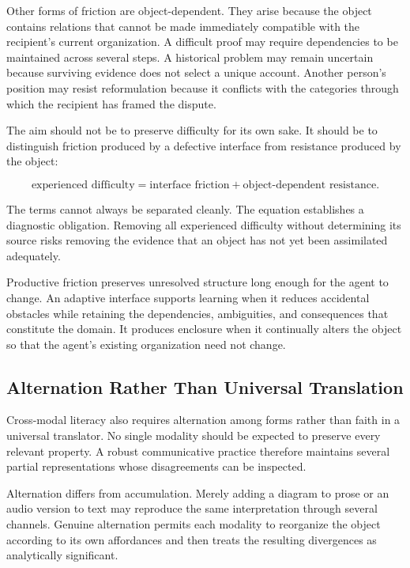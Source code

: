 \documentclass[11pt]{article}
\begin{document}
Other forms of friction are object-dependent. They arise because the object
contains relations that cannot be made immediately compatible with the
recipient's current organization. A difficult proof may require dependencies
to be maintained across several steps. A historical problem may remain
uncertain because surviving evidence does not select a unique account.
Another person's position may resist reformulation because it conflicts with
the categories through which the recipient has framed the dispute.

The aim should not be to preserve difficulty for its own sake. It should be to
distinguish friction produced by a defective interface from resistance
produced by the object:

\begin{equation}
  \text{experienced difficulty}
  =
  \text{interface friction}
  +
  \text{object-dependent resistance}.
  \label{eq:difficulty-decomposition}
\end{equation}

The terms cannot always be separated cleanly. The equation establishes a
diagnostic obligation. Removing all experienced difficulty without
determining its source risks removing the evidence that an object has not yet
been assimilated adequately.

Productive friction preserves unresolved structure long enough for the agent
to change. An adaptive interface supports learning when it reduces accidental
obstacles while retaining the dependencies, ambiguities, and consequences
that constitute the domain. It produces enclosure when it continually alters
the object so that the agent's existing organization need not change.

\subsection{Alternation Rather Than Universal Translation}

Cross-modal literacy also requires alternation among forms rather than faith
in a universal translator. No single modality should be expected to preserve
every relevant property. A robust communicative practice therefore maintains
several partial representations whose disagreements can be inspected.

Alternation differs from accumulation. Merely adding a diagram to prose or an
audio version to text may reproduce the same interpretation through several
channels. Genuine alternation permits each modality to reorganize the object
according to its own affordances and then treats the resulting divergences as
analytically significant.
\end{document}
